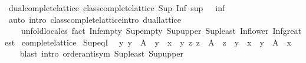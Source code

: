 \begin{isabellebody}
%
\endisadelimproof
\isanewline
{}\isamarkupfalse%
\ dual{\isacharunderscore}{\kern0pt}complete{\isacharunderscore}{\kern0pt}lattice{\isacharcolon}{\kern0pt}\ {\isachardoublequoteopen}class{\isachardot}{\kern0pt}complete{\isacharunderscore}{\kern0pt}lattice\ Sup\ Inf\ sup\ {\isacharparenleft}{\kern0pt}{\isasymge}{\isacharparenright}{\kern0pt}\ {\isacharparenleft}{\kern0pt}{\isachargreater}{\kern0pt}{\isacharparenright}{\kern0pt}\ inf\ {\isasymtop}\ {\isasymbottom}{\isachardoublequoteclose}\isanewline
%
\isadelimproof
\ \ %
\endisadelimproof
%
\isatagproof
{}\isamarkupfalse%
\ {\isacharparenleft}{\kern0pt}auto\ intro{\isacharbang}{\kern0pt}{\isacharcolon}{\kern0pt}\ class{\isachardot}{\kern0pt}complete{\isacharunderscore}{\kern0pt}lattice{\isachardot}{\kern0pt}intro\ dual{\isacharunderscore}{\kern0pt}lattice{\isacharparenright}{\kern0pt}\isanewline
\ \ \ \ {\isacharparenleft}{\kern0pt}unfold{\isacharunderscore}{\kern0pt}locales{\isacharcomma}{\kern0pt}\ {\isacharparenleft}{\kern0pt}fact\ Inf{\isacharunderscore}{\kern0pt}empty\ Sup{\isacharunderscore}{\kern0pt}empty\ Sup{\isacharunderscore}{\kern0pt}upper\ Sup{\isacharunderscore}{\kern0pt}least\ Inf{\isacharunderscore}{\kern0pt}lower\ Inf{\isacharunderscore}{\kern0pt}greatest{\isacharparenright}{\kern0pt}{\isacharplus}{\kern0pt}{\isacharparenright}{\kern0pt}%
\endisatagproof
{\isafoldproof}%
%
\isadelimproof
\isanewline
%
\endisadelimproof
\isanewline
{}\isamarkupfalse%
\isanewline
\isanewline
{}\isamarkupfalse%
\ complete{\isacharunderscore}{\kern0pt}lattice\isanewline
{}\isanewline
\isanewline
{}\isamarkupfalse%
\ Sup{\isacharunderscore}{\kern0pt}eqI{\isacharcolon}{\kern0pt}\isanewline
\ \ {\isachardoublequoteopen}{\isacharparenleft}{\kern0pt}{\isasymAnd}y{\isachardot}{\kern0pt}\ y\ {\isasymin}\ A\ {\isasymLongrightarrow}\ y\ {\isasymle}\ x{\isacharparenright}{\kern0pt}\ {\isasymLongrightarrow}\ {\isacharparenleft}{\kern0pt}{\isasymAnd}y{\isachardot}{\kern0pt}\ {\isacharparenleft}{\kern0pt}{\isasymAnd}z{\isachardot}{\kern0pt}\ z\ {\isasymin}\ A\ {\isasymLongrightarrow}\ z\ {\isasymle}\ y{\isacharparenright}{\kern0pt}\ {\isasymLongrightarrow}\ x\ {\isasymle}\ y{\isacharparenright}{\kern0pt}\ {\isasymLongrightarrow}\ {\isasymSqunion}A\ {\isacharequal}{\kern0pt}\ x{\isachardoublequoteclose}\isanewline
%
\isadelimproof
\ \ %
\endisadelimproof
%
\isatagproof
{}\isamarkupfalse%
\ {\isacharparenleft}{\kern0pt}blast\ intro{\isacharcolon}{\kern0pt}\ order{\isachardot}{\kern0pt}antisym\ Sup{\isacharunderscore}{\kern0pt}least\ Sup{\isacharunderscore}{\kern0pt}upper{\isacharparenright}{\kern0pt}%

\end{isabellebody}
